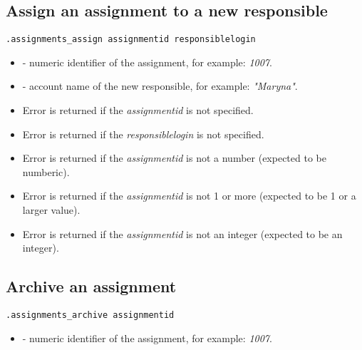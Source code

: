 \subsection{Assign an assignment to a new responsible}

\begin{lstlisting}[style=CommandLineStyle]
.assignments_assign assignmentid responsiblelogin
\end{lstlisting}

\paramsheader
\begin{itemize}
    \item {} - numeric identifier of the assignment, for example: \textit{1007}.
    \item {} - account name of the new responsible, for example: \textit{"Maryna"}.
\end{itemize}

\errheader
\begin{itemize}
    \item Error  is returned if the \textit{assignmentid} is not specified.
    \item Error  is returned if the \textit{responsiblelogin} is not specified.
    \item Error  is returned if the \textit{assignmentid} is not a number (expected to be numberic).
    \item Error  is returned if the \textit{assignmentid} is not 1 or more (expected to be 1 or a larger value).
    \item Error  is returned if the \textit{assignmentid} is not an integer (expected to be an integer).
\end{itemize}



\subsection{Archive an assignment}

\begin{lstlisting}[style=CommandLineStyle]
.assignments_archive assignmentid
\end{lstlisting}

\paramsheader
\begin{itemize}
    \item {} - numeric identifier of the assignment, for example: \textit{1007}.
\end{itemize}

